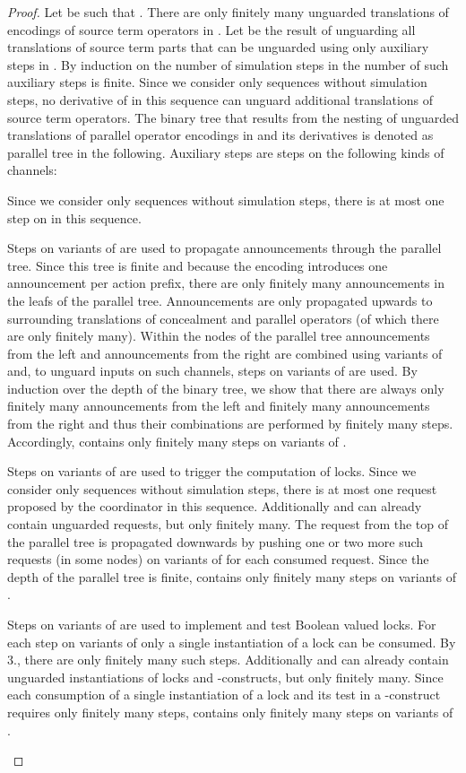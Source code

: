 \documentclass[]{eptcs}
\begin{document}
\begin{proof}
	Let  be such that .
	There are only finitely many unguarded translations of encodings of source term operators in . Let  be the result of unguarding all translations of source term parts that can be unguarded using only auxiliary steps in . By induction on the number of simulation steps in  the number of such auxiliary steps is finite. Since we consider only sequences  without simulation steps, no derivative of  in this sequence can unguard additional translations of source term operators. The binary tree that results from the nesting of unguarded translations of parallel operator encodings in  and its derivatives is denoted as parallel tree in the following. Auxiliary steps are steps on the following kinds of channels:
	\begin{compactenum}
		\item Since we consider only sequences  without simulation steps, there is at most one step on  in this sequence.
		\item Steps on variants of  are used to propagate announcements through the parallel tree. Since this tree is finite and because the encoding introduces one announcement per action prefix, there are only finitely many announcements in the leafs of the parallel tree. Announcements are only propagated upwards to surrounding translations of concealment and parallel operators (of which there are only finitely many). Within the nodes of the parallel tree announcements from the left and announcements from the right are combined using variants of  and, to unguard inputs on such channels, steps on variants of  are used. By induction over the depth of the binary tree, we show that there are always only finitely many announcements from the left and finitely many announcements from the right and thus their combinations are performed by finitely many steps. Accordingly,  contains only finitely many steps on variants of .
		\item Steps on variants of  are used to trigger the computation of locks. Since we consider only sequences  without simulation steps, there is at most one request  proposed by the coordinator in this sequence. Additionally  and  can already contain unguarded requests, but only finitely many. The request  from the top of the parallel tree is propagated downwards by pushing one or two more such requests (in some nodes) on variants of  for each consumed request. Since the depth of the parallel tree is finite,  contains only finitely many steps on variants of .
		\item Steps on variants of  are used to implement and test Boolean valued locks. For each step on variants of  only a single instantiation of a lock can be consumed. By 3., there are only finitely many such steps. Additionally  and  can already contain unguarded instantiations of locks and -constructs, but only finitely many. Since each consumption of a single instantiation of a lock and its test in a -construct requires only finitely many steps,  contains only finitely many steps on variants of .

\end{compactenum}
\end{proof}
\end{document}

